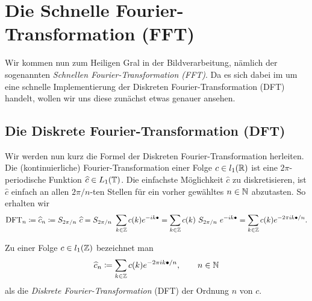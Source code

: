 \section{Die Schnelle Fourier-Transformation (FFT)}

Wir kommen nun zum Heiligen Gral in der Bildverarbeitung, nämlich der sogenannten \emph{Schnellen 
Fourier-Transformation (FFT)}. Da es sich dabei im um eine schnelle Implementierung der Diskreten 
Fourier-Transformation (DFT) handelt, wollen wir uns diese zunächst etwas genauer ansehen.

\subsection{Die Diskrete Fourier-Transformation (DFT)}

Wir werden nun kurz die Formel der Diskreten Fourier-Transformation herleiten. Die 
(kontinuierliche) Fourier-Transformation einer Folge $ c \in l_{1}(\mathbb{R}) $ ist eine
$ 2\pi $-periodische Funktion $ \widehat{c} \in L_{1}(\mathbb{T}) $. Die einfachste Möglichkeit
$ \widehat{c} $ zu diskretisieren, ist $ \widehat{c} $ einfach an allen $ 2\pi / n $-ten Stellen 
für ein vorher gewähltes $ n \in \mathbb{N} $ abzutasten. So erhalten wir
\[
    \operatorname{DFT}_{n}
  \coloneq \widehat{c}_{n}
  \coloneq S_{2\pi / n} \ \widehat{c}
  = S_{2\pi / n} \ \sum_{k \in \mathbb{Z}} c(k) e^{-ik\bullet}
  = \sum_{k \in \mathbb{Z}} c(k) \ S_{2\pi / n} \ e^{-ik\bullet}
  = \sum_{k \in \mathbb{Z}} c(k) e^{-2\pi ik\bullet / n}.
\]

\begin{definition}
Zu einer Folge $ c \in l_{1}(\mathbb{Z}) $ bezeichnet man
\[
  \widehat{c}_{n} \coloneq \sum_{k \in \mathbb{Z}} c(k) e^{-2\pi ik\bullet / n}, \qquad n \in \mathbb{N}
\]
als die \emph{Diskrete Fourier-Transformation} (DFT) der Ordnung $ n $ von $ c $.
\end{definition}

